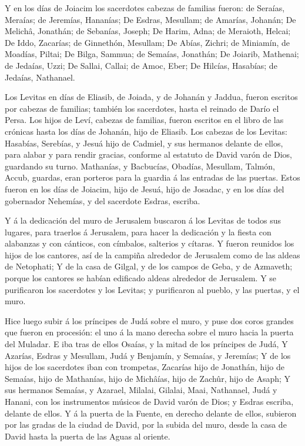  Y en los días de Joiacim los sacerdotes cabezas de
familias fueron: de Seraías, Meraías; de Jeremías, Hananías;
 De Esdras, Mesullam; de Amarías, Johanán;  De
Melichâ, Jonathán; de Sebanías, Joseph;  De Harim, Adna; de
Meraioth, Helcai;  De Iddo, Zacarías; de Ginnethón,
Mesullam;  De Abías, Zichri; de Miniamín, de Moadías,
Piltai;  De Bilga, Sammua; de Semaías, Jonathán;
 De Joiarib, Mathenai; de Jedaías, Uzzi;  De
Sallai, Callai; de Amoc, Eber;  De Hilcías, Hasabías; de
Jedaías, Nathanael.

 Los Levitas en días de Eliasib, de Joiada, y de Johanán y
Jaddua, fueron escritos por cabezas de familias; también los sacerdotes,
hasta el reinado de Darío el Persa.  Los hijos de Leví,
cabezas de familias, fueron escritos en el libro de las crónicas hasta
los días de Johanán, hijo de Eliasib.  Los cabezas de los
Levitas: Hasabías, Serebías, y Jesuá hijo de Cadmiel, y sus hermanos
delante de ellos, para alabar y para rendir gracias, conforme al
estatuto de David varón de Dios, guardando su turno. 
Mathanías, y Bacbucías, Obadías, Mesullam, Talmón, Accub, guardas, eran
porteros para la guardia á las entradas de las puertas. 
Estos fueron en los días de Joiacim, hijo de Jesuá, hijo de Josadac, y
en los días del gobernador Nehemías, y del sacerdote Esdras, escriba.

 Y á la dedicación del muro de Jerusalem buscaron á los
Levitas de todos sus lugares, para traerlos á Jerusalem, para hacer la
dedicación y la fiesta con alabanzas y con cánticos, con címbalos,
salterios y cítaras.  Y fueron reunidos los hijos de los
cantores, así de la campiña alrededor de Jerusalem como de las aldeas de
Netophati;  Y de la casa de Gilgal, y de los campos de
Geba, y de Azmaveth; porque los cantores se habían edificado aldeas
alrededor de Jerusalem.  Y se purificaron los sacerdotes y
los Levitas; y purificaron al pueblo, y las puertas, y el muro.

 Hice luego subir á los príncipes de Judá sobre el muro, y
puse dos coros grandes que fueron en procesión: el uno á la mano derecha
sobre el muro hacia la puerta del Muladar.  E iba tras de
ellos Osaías, y la mitad de los príncipes de Judá,  Y
Azarías, Esdras y Mesullam,  Judá y Benjamín, y Semaías, y
Jeremías;  Y de los hijos de los sacerdotes iban con
trompetas, Zacarías hijo de Jonathán, hijo de Semaías, hijo de
Mathanías, hijo de Michâías, hijo de Zachûr, hijo de Asaph;
 Y sus hermanos Semaías, y Azarael, Milalai, Gilalai, Maai,
Nathanael, Judá y Hanani, con los instrumentos músicos de David varón de
Dios; y Esdras escriba, delante de ellos.  Y á la puerta de
la Fuente, en derecho delante de ellos, subieron por las gradas de la
ciudad de David, por la subida del muro, desde la casa de David hasta la
puerta de las Aguas al oriente.

